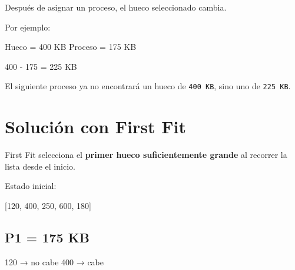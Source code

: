 \documentclass[
  spanish,
  letterpaper,
]{scrbook}
\newenvironment{Shaded}{\begin{snugshade}}{\end{snugshade}}
\newcommand{\NormalTok}[1]{\textcolor[rgb]{0.00,0.23,0.31}{#1}}
\begin{document}
\begin{tcolorbox}[enhanced jigsaw, arc=.35mm, bottomrule=.15mm, bottomtitle=1mm, breakable, colback=white, colbacktitle=quarto-callout-important-color!10!white, colframe=quarto-callout-important-color-frame, coltitle=black, left=2mm, leftrule=.75mm, opacityback=0, opacitybacktitle=0.6, rightrule=.15mm, title=\textcolor{quarto-callout-important-color}{\faExclamation}\hspace{0.5em}{Regla de la simulación}, titlerule=0mm, toprule=.15mm, toptitle=1mm]

Después de asignar un proceso, el hueco seleccionado cambia.

Por ejemplo:

\begin{Shaded}
\begin{Highlighting}[]
\NormalTok{Hueco = 400 KB}
\NormalTok{Proceso = 175 KB}

\NormalTok{400 {-} 175 = 225 KB}
\end{Highlighting}
\end{Shaded}

El siguiente proceso ya no encontrará un hueco de \texttt{400\ KB}, sino
uno de \texttt{225\ KB}.

\end{tcolorbox}


\chapter{Solución con First Fit}\label{soluciuxf3n-con-first-fit}

First Fit selecciona el \textbf{primer hueco suficientemente grande} al
recorrer la lista desde el inicio.

Estado inicial:

\begin{Shaded}
\begin{Highlighting}[]
\NormalTok{[120, 400, 250, 600, 180]}
\end{Highlighting}
\end{Shaded}

\section{P1 = 175 KB}\label{p1-175-kb}

\begin{Shaded}
\begin{Highlighting}[]
\NormalTok{120 → no cabe}
\NormalTok{400 → cabe}
\end{Highlighting}
\end{Shaded}
\end{document}
